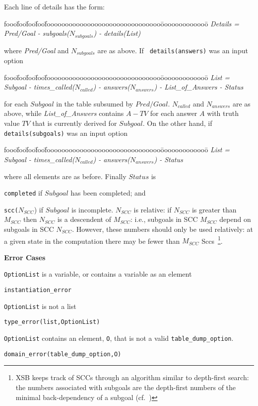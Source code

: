 \begin{description}
Each line of details has the form:

\begin{tabbing}
fooo\=foo\=foo\=foo\=fooooooooooooooooooooooooooooooo\=ooooooooooooo\=\kill
%
{\em   Details = } \\
\> {\em Pred/Goal  - subgoals($N_{subgoals}$) - details(List)}
%
\end{tabbing}
%
where {\em Pred/Goal} and $N_{subgoals}$ are as above.  If {\tt
  details(answers)} was an input option
%
\begin{tabbing}
fooo\=foo\=foo\=foo\=fooooooooooooooooooooooooooooooo\=ooooooooooooo\=\kill
%
{\em List = }\\
\>  {\em Subgoal - times\_called($N_{called}$) - answers($N_{answers}$) - List\_of\_Answers - Status}
%
\end{tabbing}
%
for each $Subgoal$ in the table subsumed by $Pred/Goal$.  $N_{called}$
and $N_{answers}$ are as above, while {\em List\_of\_Answers} contains
$A-TV$ for each answer $A$ with truth value $TV$ that is currently
derived for $Subgoal$.  On the other hand, if {\tt details(subgoals)}
was an input option
\begin{tabbing}
fooo\=foo\=foo\=foo\=fooooooooooooooooooooooooooooooo\=ooooooooooooo\=\kill
%
{\em List = }\\
\>  {\em Subgoal - times\_called($N_{called}$) - answers($N_{answers}$) - Status}
%
\end{tabbing}
%
where all elements are as before.  Finally $Status$ is
%
\bi
\item {\tt completed} if $Subgoal$ has been completed; and
%
\item {\tt scc($N_{SCC}$}) if $Subgoal$ is incomplete.  $N_{SCC}$ is
  relative: if $N_{SCC}$ is greater than $M_{SCC}$ then $N_{SCC}$ is a
  descendent of $M_{SCC}$: i.e., subgoals in SCC $M_{SCC}$ depend on
  subgoals in SCC $N_{SCC}$.  However, these numbers should only be
  used relatively: at a given state in the computation there may be
  fewer than $M_{SCC}$ Sccs~\footnote{XSB keeps track of SCCs through
    an algorithm similar to depth-first search: the numbers associated
    with subgoals are the depth-first numbers of the minimal
    back-dependency of a subgoal (cf.~\cite{SaSw98})}.
\ei


{\bf Error Cases}
\bi
\item {\tt OptionList} is a variable, or contains a variable as an element
\bi
\item {\tt instantiation\_error}
\ei
\item {\tt OptionList} is not a list
\bi
\item {\tt type\_error(list,OptionList)}
\ei
\item {\tt OptionList} contains an element, {\tt O}, that is not a
  valid {\tt table\_dump\_option}.
\bi
\item {\tt domain\_error(table\_dump\_option,O)}
\ei
\ei


\end{description}
